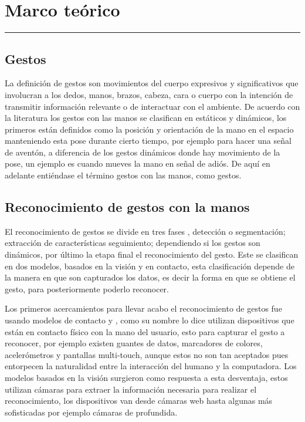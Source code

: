 \chapter{Marco te\'orico}\label{capit:cap2}
\vspace{-2.0325ex}%
\noindent
\rule{\textwidth}{0.5pt}
\vspace{-5.5ex}%
\newcommand{\pushline}{\Indp}%

\section{Gestos}\label{sec:2Gestos}
La definición de gestos \citep{Mitra2007} son movimientos del cuerpo expresivos y significativos que involucran a los dedos, manos, brazos, cabeza, cara o cuerpo con la intención de transmitir información relevante o de interactuar con el ambiente. De acuerdo con la literatura \citep{Mitra2007} los gestos con las manos se clasifican en estáticos y dinámicos, los primeros están definidos como la posición y orientación de la mano en el espacio manteniendo esta pose durante cierto tiempo, por ejemplo para hacer una se\~nal de aventón, a diferencia de los gestos dinámicos donde hay movimiento de la pose, un ejemplo  es cuando mueves la mano en se\~nal de adiós. De aquí en adelante entiéndase el término gestos con las manos, como gestos. 

\section{Reconocimiento de gestos con la manos}\label{sec:2ReconocimientoGestos} 
El reconocimiento de gestos se divide en tres fases \citep{Rautaray2012}, detección o segmentación; extracci\'on de caracter\'isticas seguimiento; dependiendo si los gestos son dinámicos, por último la etapa final el reconocimiento del gesto.  
Este se clasifican en dos modelos, basados en la visi\'on y en contacto, esta clasificaci\'on depende de la manera en que son capturados los datos, es decir la forma en que se obtiene el gesto, para posteriormente poderlo reconocer. 

Los primeros acercamientos para llevar acabo el reconocimiento de gestos fue usando modelos de contacto \citep{Rautaray2012} y \citep{Nayakwadi2014}, como su nombre lo dice utilizan dispositivos que est\'an en contacto f\'isico con la mano del usuario, esto para capturar el gesto a reconocer, por ejemplo existen guantes de datos, marcadores de colores, acelerómetros y pantallas multi-touch, aunque estos no son tan aceptados pues entorpecen la naturalidad entre la interacción del humano y la computadora. Los modelos basados en la visi\'on surgieron como respuesta a esta desventaja, estos utilizan cámaras para extraer la información necesaria para realizar el reconocimiento, los dispositivos van desde c\'amaras web hasta algunas más sofisticadas por ejemplo c\'amaras de profundida.  


